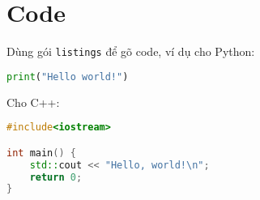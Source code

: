 \section{Code}
Dùng gói \texttt{listings} để gõ code, ví dụ cho Python:

\begin{lstlisting}[language=Python]
print("Hello world!")
\end{lstlisting}

\noindent Cho C++:
\begin{lstlisting}[language=C++]
#include<iostream>

int main() {
    std::cout << "Hello, world!\n";
    return 0;
}
\end{lstlisting}